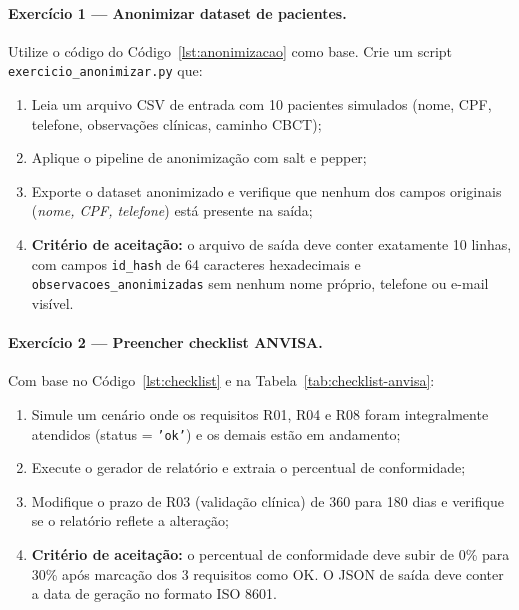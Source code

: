 \paragraph{Exercício 1 — Anonimizar dataset de pacientes.}
Utilize o código do Código~\ref{lst:anonimizacao} como base. Crie um script \texttt{exercicio\_anonimizar.py} que:
\begin{enumerate}
    \item Leia um arquivo CSV de entrada com 10 pacientes simulados (nome, CPF, telefone, observações clínicas, caminho CBCT);
    \item Aplique o pipeline de anonimização com salt e pepper;
    \item Exporte o dataset anonimizado e verifique que nenhum dos campos originais (\textit{nome, CPF, telefone}) está presente na saída;
    \item \textbf{Critério de aceitação:} o arquivo de saída deve conter exatamente 10 linhas, com campos \texttt{id\_hash} de 64 caracteres hexadecimais e \texttt{observacoes\_anonimizadas} sem nenhum nome próprio, telefone ou e-mail visível.
\end{enumerate}

\paragraph{Exercício 2 — Preencher checklist ANVISA.}
Com base no Código~\ref{lst:checklist} e na Tabela~\ref{tab:checklist-anvisa}:
\begin{enumerate}
    \item Simule um cenário onde os requisitos R01, R04 e R08 foram integralmente atendidos (status = \texttt{'ok'}) e os demais estão em andamento;
    \item Execute o gerador de relatório e extraia o percentual de conformidade;
    \item Modifique o prazo de R03 (validação clínica) de 360 para 180 dias e verifique se o relatório reflete a alteração;
    \item \textbf{Critério de aceitação:} o percentual de conformidade deve subir de 0\% para 30\% após marcação dos 3 requisitos como OK. O JSON de saída deve conter a data de geração no formato ISO 8601.
\end{enumerate}

